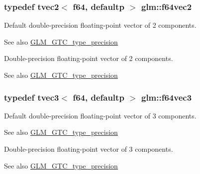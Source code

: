 \subsubsection[{f64vec2}]{\setlength{\rightskip}{0pt plus 5cm}typedef tvec2$<$ f64, defaultp $>$ {\bf glm\+::f64vec2}}\label{group__gtc__type__precision_gacde4fe7b129521888cd30672c34650c5}
Default double-\/precision floating-\/point vector of 2 components. \begin{DoxySeeAlso}{See also}
\hyperlink{group__gtc__type__precision}{G\+L\+M\+\_\+\+G\+T\+C\+\_\+type\+\_\+precision}
\end{DoxySeeAlso}
Double-\/precision floating-\/point vector of 2 components. \begin{DoxySeeAlso}{See also}
\hyperlink{group__gtc__type__precision}{G\+L\+M\+\_\+\+G\+T\+C\+\_\+type\+\_\+precision} 
\end{DoxySeeAlso}
\hypertarget{group__gtc__type__precision_gac531875c6544b7919f36a86cbe538736}{}
\subsubsection[{f64vec3}]{\setlength{\rightskip}{0pt plus 5cm}typedef tvec3$<$ f64, defaultp $>$ {\bf glm\+::f64vec3}}\label{group__gtc__type__precision_gac531875c6544b7919f36a86cbe538736}
Default double-\/precision floating-\/point vector of 3 components. \begin{DoxySeeAlso}{See also}
\hyperlink{group__gtc__type__precision}{G\+L\+M\+\_\+\+G\+T\+C\+\_\+type\+\_\+precision}
\end{DoxySeeAlso}
Double-\/precision floating-\/point vector of 3 components. \begin{DoxySeeAlso}{See also}
\hyperlink{group__gtc__type__precision}{G\+L\+M\+\_\+\+G\+T\+C\+\_\+type\+\_\+precision} 
\end{DoxySeeAlso}
\hypertarget{group__gtc__type__precision_ga9d896f484039b22873e7bfb9e06f7b47}{}
